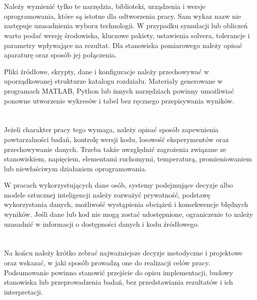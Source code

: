 \section{}

Należy wymienić tylko te narzędzia, biblioteki, urządzenia i wersje oprogramowania, które są istotne dla odtworzenia pracy. Sam wykaz nazw nie zastępuje uzasadnienia wyboru technologii. W przypadku symulacji lub obliczeń warto podać wersję środowiska, kluczowe pakiety, ustawienia solvera, tolerancje i parametry wpływające na rezultat. Dla stanowiska pomiarowego należy opisać aparaturę oraz sposób jej połączenia.

Pliki źródłowe, skrypty, dane i konfiguracje należy przechowywać w uporządkowanej strukturze katalogu rozdziału. Materiały generowane w programach MATLAB, Python lub innych narzędziach powinny umożliwiać ponowne utworzenie wykresów i tabel bez ręcznego przepisywania wyników.

\section{}

Jeżeli charakter pracy tego wymaga, należy opisać sposób zapewnienia powtarzalności badań, kontrolę wersji kodu, losowość eksperymentów oraz przechowywanie danych. Trzeba także uwzględnić zagrożenia związane ze stanowiskiem, napięciem, elementami ruchomymi, temperaturą, promieniowaniem lub niewłaściwym działaniem oprogramowania.

W pracach wykorzystujących dane osób, systemy podejmujące decyzje albo modele sztucznej inteligencji należy rozważyć prywatność, podstawę wykorzystania danych, możliwość wystąpienia obciążeń i konsekwencje błędnych wyników. Jeśli dane lub kod nie mogą zostać udostępnione, ograniczenie to należy uzasadnić w informacji o dostępności danych i kodu źródłowego.

\section{}

Na końcu należy krótko zebrać najważniejsze decyzje metodyczne i projektowe oraz wskazać, w jaki sposób prowadzą one do realizacji celów pracy. Podsumowanie powinno stanowić przejście do opisu implementacji, budowy stanowiska lub przeprowadzenia badań, bez przedstawiania rezultatów i ich interpretacji.
